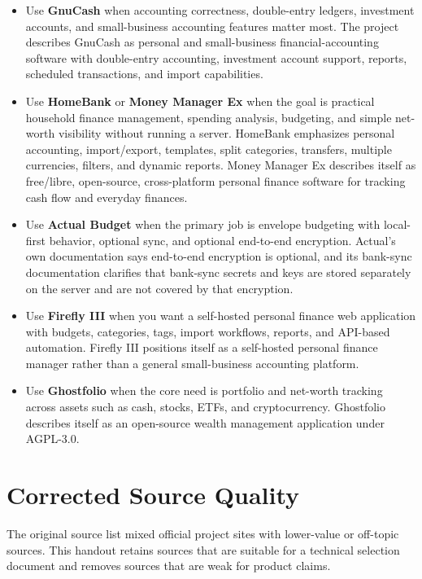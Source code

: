 \documentclass[11pt]{article}
\newcommand{\tool}[1]{\textbf{#1}}
\begin{document}
\begin{itemize}
  \item Use \tool{GnuCash} when accounting correctness, double-entry ledgers, investment accounts, and small-business accounting features matter most. The project describes GnuCash as personal and small-business financial-accounting software with double-entry accounting, investment account support, reports, scheduled transactions, and import capabilities.\cite{gnucash-home,gnucash-features}
  \item Use \tool{HomeBank} or \tool{Money Manager Ex} when the goal is practical household finance management, spending analysis, budgeting, and simple net-worth visibility without running a server. HomeBank emphasizes personal accounting, import/export, templates, split categories, transfers, multiple currencies, filters, and dynamic reports.\cite{homebank-home} Money Manager Ex describes itself as free/libre, open-source, cross-platform personal finance software for tracking cash flow and everyday finances.\cite{mmex-home,mmex-docs}
  \item Use \tool{Actual Budget} when the primary job is envelope budgeting with local-first behavior, optional sync, and optional end-to-end encryption. Actual's own documentation says end-to-end encryption is optional, and its bank-sync documentation clarifies that bank-sync secrets and keys are stored separately on the server and are not covered by that encryption.\cite{actual-home,actual-sync,actual-bank-sync}
  \item Use \tool{Firefly III} when you want a self-hosted personal finance web application with budgets, categories, tags, import workflows, reports, and API-based automation. Firefly III positions itself as a self-hosted personal finance manager rather than a general small-business accounting platform.\cite{firefly-home,firefly-docs,firefly-github}
  \item Use \tool{Ghostfolio} when the core need is portfolio and net-worth tracking across assets such as cash, stocks, ETFs, and cryptocurrency. Ghostfolio describes itself as an open-source wealth management application under AGPL-3.0.\cite{ghostfolio-home,ghostfolio-github,ghostfolio-open}
\end{itemize}

\section{Corrected Source Quality}

The original source list mixed official project sites with lower-value or off-topic sources. This handout retains sources that are suitable for a technical selection document and removes sources that are weak for product claims.
\end{document}

